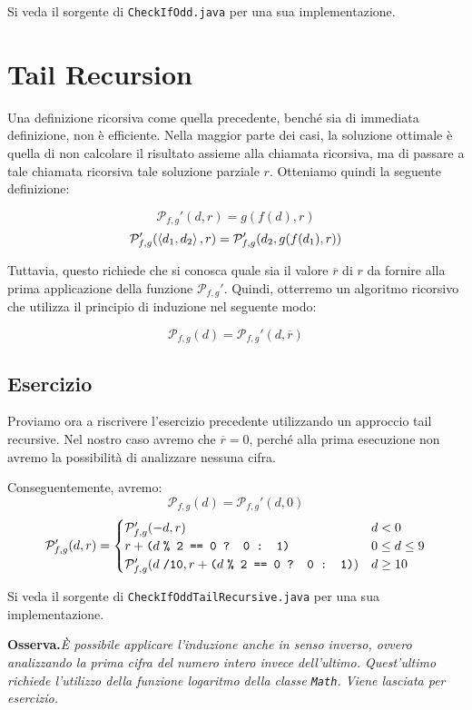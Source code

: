 \documentclass[]{scrartcl}
\newcommand{\prog}{\ensuremath{\mathcal{P}_{f,g}}}
\begin{document}
Si veda il sorgente di \texttt{CheckIfOdd.java} per una sua implementazione.

\section{Tail Recursion}
Una definizione ricorsiva come quella precedente, benché sia di immediata definizione, non è efficiente. Nella maggior parte dei casi, la soluzione ottimale è quella di non calcolare il risultato assieme alla chiamata ricorsiva, ma di passare a tale chiamata ricorsiva tale soluzione parziale $r$. Otteniamo quindi la seguente definizione:

\[\prog'(d,r)=g(f(d),r)\]
\[\prog'(\Braket{d_1,d_2},r)=\prog'(d_2,g(f(d_1),r))\]

Tuttavia, questo richiede che si conosca quale sia il valore $\overline{r}$ di $r$ da fornire alla prima applicazione della funzione $\prog'$. Quindi, otterremo un algoritmo ricorsivo che utilizza il principio di induzione nel seguente modo:

\[\prog(d)=\prog'(d,\overline{r})\]

\subsection{Esercizio}
Proviamo ora a riscrivere l'esercizio precedente utilizzando un approccio tail recursive. Nel nostro caso avremo che  $\overline{r}=0$, perché alla prima esecuzione non avremo la possibilità di analizzare nessuna cifra. 

Conseguentemente, avremo:
\[\prog(d)=\prog'(d,0)\]
\[\prog'(d,r)=\begin{cases}
\prog'(-d,r) & d < 0\\
r+\texttt{(}d \texttt{\;\% 2 == 0 ? 0 : 1)} & 0\leq d\leq 9\\
\prog'(d\texttt{\;/10},r+\texttt{(}d \texttt{\;\% 2 == 0 ? 0 : 1)}) & d\geq 10\\
\end{cases}\]

Si veda il sorgente di \texttt{CheckIfOddTailRecursive.java} per una sua implementazione.
\medskip

\textbf{Osserva.}\textit{È possibile applicare l'induzione anche in senso inverso, ovvero analizzando la prima cifra del numero intero invece dell'ultimo. Quest'ultimo richiede l'utilizzo della funzione logaritmo della classe \texttt{Math}. Viene lasciata per esercizio.}
\end{document}
